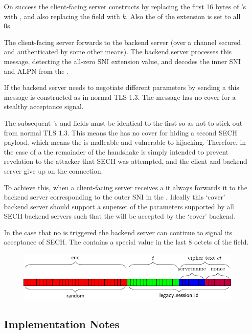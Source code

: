 On success the client-facing server constructs  by replacing 
the first 16 bytes of 's 
with , and also replacing the  field
with $k$. Also the  of the  extension is set to all 0s.

The client-facing server forwards  to the backend server
(over a channel secured and authenticated by some other means).
The backend server processes this message, detecting the all-zero \ac{SNI} extension value,
and decodes the inner \ac{SNI} and \ac{ALPN} from the \varlegacysessionid{}.

If the backend server needs to negotiate different parameters by sending a
 this message is constructed as in normal \ac{TLS} 1.3.
The  message has no cover for a stealthy acceptance signal.

The subsequent 's  and \varlegacysessionid{} fields
must be identical to the first  so as not to stick out from normal
\ac{TLS} 1.3. This means the  has no cover for hiding a second
\ac{SECH} payload, which means the  is malleable and 
vulnerable to  hijacking.
Therefore, in the case of a  the remainder of the handshake is simply intended
to prevent revelation to the attacker that \ac{SECH} was attempted, and
the client and backend server give up on the connection.

To achieve this, when a client-facing server receives a  it always
forwards it to the backend server corresponding to the outer \ac{SNI} in the . Ideally this `cover' backend server should support a superset of
the parameters supported by all \ac{SECH} backend servers such that the 
will be accepted by the `cover' backend.

In the case that no  is triggered the backend server can continue to signal
its acceptance of \ac{SECH}.
The  contains a special  value in the last 8 octets of the  field.


\begin{figure}[htb]
\centering
\includegraphics[width=\linewidth]{figure/sech5-cover.pdf}
\captionsetup{width=.8\linewidth} 
\caption[SECH 5 Cover]{}
\label{fig:sech5-cover}
\end{figure}

\subsection{Implementation Notes}